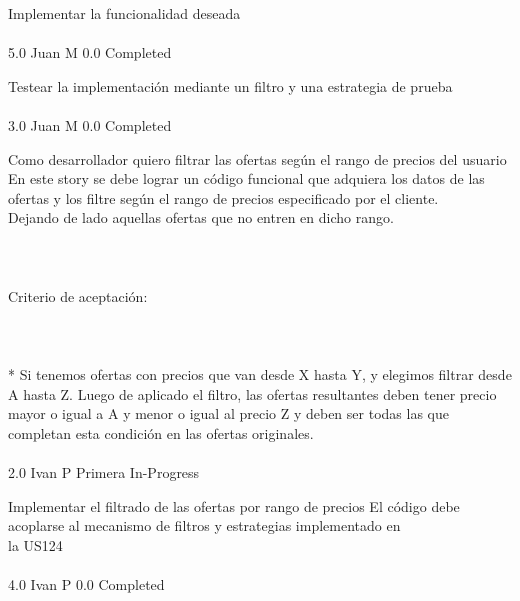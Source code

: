 		{Implementar la funcionalidad deseada} %
		{\\
\\
} %
		{5.0} %
		{Juan M} %
		{0.0} %
		{Completed} %

		{Testear la implementación mediante un filtro y una estrategia de prueba} %
		{\\
\\
} %
		{3.0} %
		{Juan M} %
		{0.0} %
		{Completed} %


\vspace{20pt}

	{Como desarrollador quiero filtrar las ofertas según el rango de precios del usuario} %
	{En este story se debe lograr un código funcional que adquiera los datos de las\\
ofertas y los filtre según el rango de precios especificado por el cliente.\\
Dejando de lado aquellas ofertas que no entren en dicho rango.\\
\\
  \\
\\
Criterio de aceptación:\\
\\
  \\
\\
* Si tenemos ofertas con precios que van desde X hasta Y, y elegimos filtrar desde A hasta Z.  Luego de aplicado el filtro, las ofertas resultantes deben tener precio mayor o igual a A y menor o igual al precio Z y deben ser todas las que completan esta condición en las ofertas originales.\\
\\
} %
	{} %
	{2.0} %
	{Ivan P} %
	{Primera} %
	{In-Progress} %

		{Implementar el filtrado de las ofertas por rango de precios} %
		{El código debe acoplarse al mecanismo de filtros y estrategias implementado en\\
la US124\\
\\
} %
		{4.0} %
		{Ivan P} %
		{0.0} %
		{Completed} %

